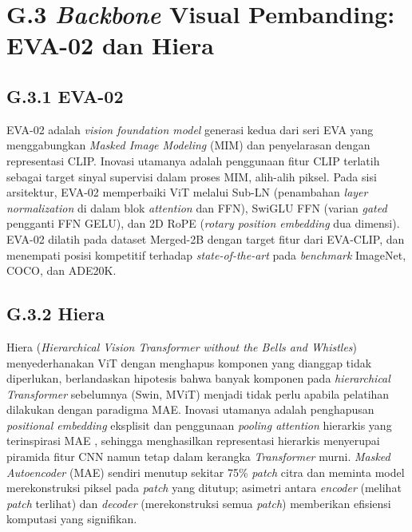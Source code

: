 \section*{G.3 \textit{Backbone} Visual Pembanding: EVA-02 dan Hiera}
\label{app:backbone-detail}

\subsection*{G.3.1 EVA-02}

EVA-02 \citep{fangEVA022023} adalah \textit{vision foundation model} generasi kedua dari seri EVA yang menggabungkan \textit{Masked Image Modeling} (MIM) dan penyelarasan dengan representasi CLIP. Inovasi utamanya adalah penggunaan fitur CLIP terlatih sebagai target sinyal supervisi dalam proses MIM, alih-alih piksel. Pada sisi arsitektur, EVA-02 memperbaiki ViT melalui Sub-LN (penambahan \textit{layer normalization} di dalam blok \textit{attention} dan FFN), SwiGLU FFN (varian \textit{gated} pengganti FFN GELU), dan 2D RoPE (\textit{rotary position embedding} dua dimensi). EVA-02 dilatih pada dataset Merged-2B dengan target fitur dari EVA-CLIP, dan menempati posisi kompetitif terhadap \textit{state-of-the-art} pada \textit{benchmark} ImageNet, COCO, dan ADE20K.

\subsection*{G.3.2 Hiera}

Hiera (\textit{Hierarchical Vision Transformer without the Bells and Whistles}) \citep{ryaliHiera2023} menyederhanakan ViT dengan menghapus komponen yang dianggap tidak diperlukan, berlandaskan hipotesis bahwa banyak komponen pada \textit{hierarchical Transformer} sebelumnya (Swin, MViT) menjadi tidak perlu apabila pelatihan dilakukan dengan paradigma MAE. Inovasi utamanya adalah penghapusan \textit{positional embedding} eksplisit dan penggunaan \textit{pooling attention} hierarkis yang terinspirasi MAE \citep{heMAE2022}, sehingga menghasilkan representasi hierarkis menyerupai piramida fitur CNN namun tetap dalam kerangka \textit{Transformer} murni. \textit{Masked Autoencoder} (MAE) sendiri menutup sekitar 75\% \textit{patch} citra dan meminta model merekonstruksi piksel pada \textit{patch} yang ditutup; asimetri antara \textit{encoder} (melihat \textit{patch} terlihat) dan \textit{decoder} (merekonstruksi semua \textit{patch}) memberikan efisiensi komputasi yang signifikan.

